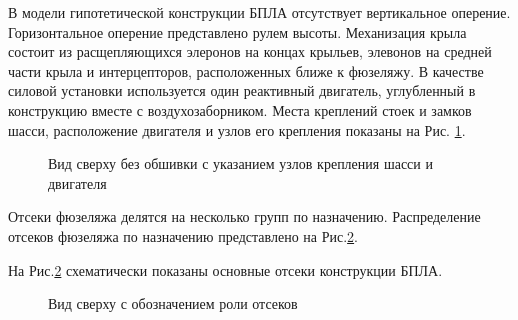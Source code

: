 В модели гипотетической конструкции БПЛА отсутствует вертикальное оперение. Горизонтальное оперение представлено рулем высоты. Механизация крыла состоит из расщепляющихся элеронов на концах крыльев, элевонов на средней части крыла и интерцепторов, расположенных ближе к фюзеляжу. В качестве силовой установки используется один реактивный двигатель, углубленный в конструкцию вместе с воздухозаборником. Места креплений стоек и замков шасси, расположение двигателя и узлов его крепления показаны на Рис. \ref{fig:BPS_Catia_Top_WithoutSkin}. 


\begin{figure}[H]
\centering
\def\svgwidth{0.9\textwidth}

\caption{Вид сверху без обшивки с указанием узлов крепления шасси и двигателя}
\label{fig:BPS_Catia_Top_WithoutSkin}
\end{figure}

Отсеки фюзеляжа делятся на несколько групп по назначению. Распределение отсеков фюзеляжа по назначению представлено на Рис.\ref{fig:BPS_Catia_Top_PartRoles}. 

На Рис.\ref{fig:BPS_Catia_Top_PartRoles} схематически показаны основные отсеки конструкции БПЛА. 

\begin{figure}[H]
\centering
\def\svgwidth{0.9\textwidth}

\caption{Вид сверху с обозначением роли отсеков}
\label{fig:BPS_Catia_Top_PartRoles}
\end{figure}
